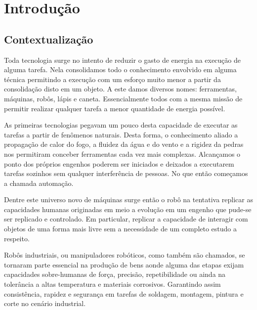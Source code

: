 \chapter{Introdução} \label{ch:intro}



\section{Contextualização}


Toda tecnologia surge no intento de reduzir o gasto de energia na execução de alguma tarefa. Nela consolidamos todo o conhecimento envolvido em alguma técnica permitindo a execução com um esforço muito menor a partir da consolidação disto em um objeto. A este damos diversos nomes: ferramentas, máquinas, robôs, lápis e caneta. Essencialmente todos com a mesma missão de permitir realizar qualquer tarefa a menor quantidade de energia possível.

As primeiras tecnologias pegavam um pouco desta capacidade de executar as tarefas a partir de fenômenos naturais. Desta forma, o conhecimento aliado a propagação de calor do fogo, a fluidez da água e do vento e a rigidez da pedras nos permitiram conceber ferramentas cada vez mais complexas. Alcançamos o ponto dos próprios engenhos poderem ser iniciados e deixados a executarem tarefas sozinhos sem qualquer interferência de pessoas. No que então começamos a chamada automação.


Dentre este universo novo de máquinas surge então o robô na tentativa replicar as capacidades humanas originadas em meio a evolução em um engenho que pude-se ser replicado e controlado. Em particular, replicar a capacidade de interagir com objetos de uma forma mais livre sem a necessidade de um completo estudo a respeito.

Robôs industriais, ou manipuladores robóticos, como também são chamados, se tornaram parte essencial na produção de bens aonde alguma das etapas exijam capacidades sobre-humanas de força, precisão, repetibilidade ou ainda na tolerância a altas temperatura e materiais corrosivos. Garantindo assim consistência, rapidez e segurança em tarefas de soldagem, montagem, pintura e corte no cenário industrial.

